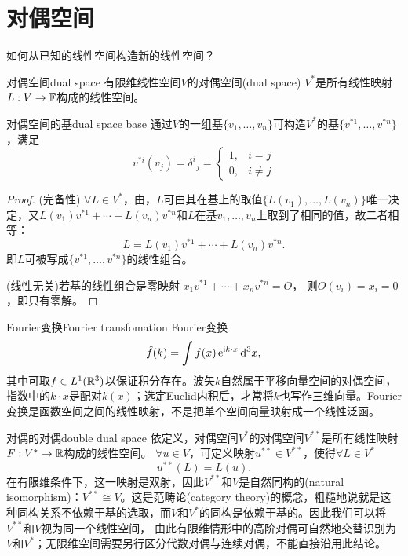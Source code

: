 \section{对偶空间}

如何从已知的线性空间构造新的线性空间？
\begin{definition}{对偶空间}{dual space}
	有限维线性空间$V$的对偶空间(dual space) $V^\ast$是所有线性映射$L:V \to \mathbb{F}$构成的线性空间。
\end{definition}
\begin{theorem}{对偶空间的基}{dual space base}
	通过$V$的一组基$\{v_1,\ldots,v_n\}$可构造$V^\ast$的基$\{v^{\ast 1},\ldots,v^{\ast n}\}$，满足
	\begin{equation}
		v^{\ast i}(v_j) = \delta^i{}_j =
		\begin{cases}
			1,&i = j\\0,&i \neq j
		\end{cases}
	\end{equation}
\end{theorem}
\begin{proof}
	(完备性) $\forall L \in V^\ast$，由，$L$可由其在基上的取值$\{L(v_1),\ldots,L(v_n)\}$唯一决定，又$L(v_1)v^{\ast 1} + \cdots + L(v_n)v^{\ast n}$和$L$在基$v_1,\ldots,v_n$上取到了相同的值，故二者相等：
	\begin{equation}\label{eq:la-dual-basis-expansion}
		L = L(v_1)v^{\ast 1} + \cdots + L(v_n)v^{\ast n}.
	\end{equation}
	即$L$可被写成$\{v^{\ast 1},\ldots,v^{\ast n}\}$的线性组合。

	(线性无关)若基的线性组合是零映射
	$x_1v^{\ast 1} + \cdots + x_nv^{\ast n} = O$，
	则$O(v_i) = x_i = 0$，即只有零解。
\end{proof}
\begin{example}{Fourier变换}{Fourier transfomation}
	Fourier变换
	\[
		\hat f(k) = \int f(x)\mathop{}\!\mathrm{e}^{\mathrm{i} k\cdot x}\mathop{}\!\mathrm{d}^3x,
	\]
	其中可取$f \in L^1(\mathbb{R}^3)$以保证积分存在。波矢$k$自然属于平移向量空间的对偶空间，指数中的$k \cdot x$是配对$k(x)$；选定Euclid内积后，才常将$k$也写作三维向量。Fourier变换是函数空间之间的线性映射，不是把单个空间向量映射成一个线性泛函。
\end{example}
\begin{example}{对偶的对偶}{double dual space}
	依定义，对偶空间$V^\ast$的对偶空间$V^{\ast\ast}$是所有线性映射$F:V^\ast \to \mathbb{R}$构成的线性空间。%
	$\forall u \in V$，可定义映射$u^{\ast\ast} \in V^{\ast\ast}$，使得$\forall L \in V^\ast$
	\begin{equation}
		u^{\ast\ast}(L) = L(u).
	\end{equation}
	在有限维条件下，这一映射是双射，因此$V^{\ast\ast}$和$V$是自然同构的(natural isomorphism)：$V^{\ast\ast} \cong V$。这是范畴论(category theory)的概念，粗糙地说就是这种同构关系不依赖于基的选取，而$V$和$V^\ast$的同构是依赖于基的。因此我们可以将$V^{\ast\ast}$和$V$视为同一个线性空间，
	由此有限维情形中的高阶对偶可自然地交替识别为$V$和$V^\ast$；无限维空间需要另行区分代数对偶与连续对偶，不能直接沿用此结论。
\end{example}

